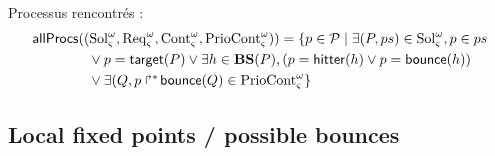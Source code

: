 
Processus rencontrés :
\begin{align*}
&\mathsf{allProcs}((\mathrm{Sol}_\varsigma^\omega,\mathrm{Req}_\varsigma^\omega,\mathrm{Cont}_\varsigma^\omega,\mathrm{PrioCont}_\varsigma^\omega)) = \{ p \in \mathcal{P} \mid \exists (P,ps) \in \mathrm{Sol}_\varsigma^\omega, p \in ps \\
  &\qquad\qquad \vee p = \mathsf{target}(P) \vee \exists h \in \mathbf{BS}(P), (p = \mathsf{hitter}(h) \vee p = \mathsf{bounce}(h)) \\
  &\qquad\qquad \vee \exists(Q, \mbox{$p\Rsh^*\!\mathsf{bounce}(Q)$} \in \mathrm{PrioCont}_\varsigma^\omega \}
\end{align*}

\subsection{Local fixed points / possible bounces}


